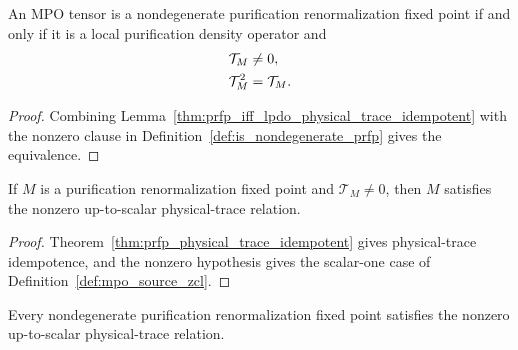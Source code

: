 \begin{lemma}
    \label{thm:nondegenerate_prfp_iff_lpdo_normalized_zcl}
    \leanok
    An MPO tensor is a nondegenerate purification renormalization fixed point if
    and only if it is a local purification density operator and
    \begin{align}
        \mathcal T_M   & \ne0,
        \notag                          \\
        \mathcal T_M^2 & =\mathcal T_M.
        \notag
    \end{align}
\end{lemma}

\begin{proof}
    \leanok
    Combining Lemma~\ref{thm:prfp_iff_lpdo_physical_trace_idempotent} with
    the nonzero clause in Definition~\ref{def:is_nondegenerate_prfp} gives the
    equivalence.
\end{proof}

\begin{lemma}
    \label{thm:source_zcl_of_prfp}
    \leanok
    If $M$ is a purification renormalization fixed point and
    $\mathcal T_M\ne0$, then $M$ satisfies the nonzero up-to-scalar
    physical-trace relation.
\end{lemma}

\begin{proof}\leanok
    Theorem~\ref{thm:prfp_physical_trace_idempotent} gives physical-trace
    idempotence, and the nonzero hypothesis gives the scalar-one case of
    Definition~\ref{def:mpo_source_zcl}.
\end{proof}

\begin{lemma}
    \label{thm:nondegenerate_prfp_source_zcl}
    \leanok
    Every nondegenerate purification renormalization fixed point satisfies the
    nonzero up-to-scalar physical-trace relation.
\end{lemma}

